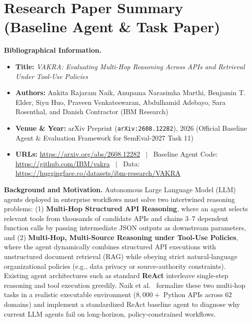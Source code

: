 \documentclass[10pt]{article}
\begin{document}
\section{Research Paper Summary (Baseline Agent \& Task Paper)}

\textbf{Bibliographical Information.}
\begin{itemize}
    \item \textbf{Title:} \textit{VAKRA: Evaluating Multi-Hop Reasoning Across APIs and Retrieval Under Tool-Use Policies}
    \item \textbf{Authors:} Ankita Rajaram Naik, Anupama Narasimha Murthi, Benjamin T. Elder, Siyu Huo, Praveen Venkateswaran, Abdulhamid Adebayo, Sara Rosenthal, and Danish Contractor (IBM Research)
    \item \textbf{Venue \& Year:} arXiv Preprint (\texttt{arXiv:2608.12282}), 2026 (Official Baseline Agent \& Evaluation Framework for SemEval-2027 Task 11)
    \item \textbf{URLs:} \url{https://arxiv.org/abs/2608.12282} \ $|$ \ Baseline Agent Code: \url{https://github.com/IBM/vakra} \ $|$ \ Data: \url{https://huggingface.co/datasets/ibm-research/VAKRA}
\end{itemize}

\textbf{Background and Motivation.}
Autonomous Large Language Model (LLM) agents deployed in enterprise workflows must solve two intertwined reasoning problems: (1) \textbf{Multi-Hop Structured API Reasoning}, where an agent selects relevant tools from thousands of candidate APIs and chains $3\text{--}7$ dependent function calls by passing intermediate JSON outputs as downstream parameters, and (2) \textbf{Multi-Hop, Multi-Source Reasoning under Tool-Use Policies}, where the agent dynamically combines structured API executions with unstructured document retrieval (RAG) while obeying strict natural-language organizational policies (e.g., data privacy or source-authority constraints). Existing agent architectures such as standard \textbf{ReAct} \cite{yao2023react} interleave single-step reasoning and tool execution greedily. Naik et al.\ \cite{naik2026vakra} formalize these two multi-hop tasks in a realistic executable environment ($8,000+$ Python APIs across $62$ domains) and implement a standardized ReAct baseline agent to diagnose why current LLM agents fail on long-horizon, policy-constrained workflows.
\end{document}
